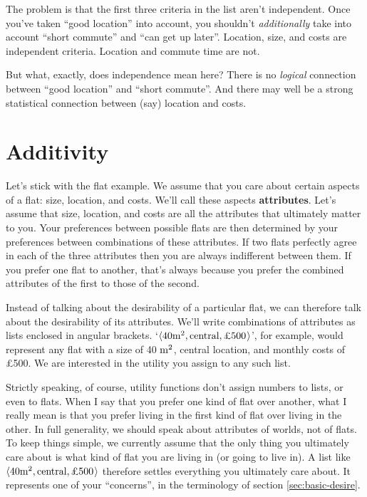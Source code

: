 The problem is that the first three criteria in the list aren't independent.
Once you've taken ``good location'' into account, you shouldn't
\emph{additionally} take into account ``short commute'' and ``can get up
later''. Location, size, and costs are independent criteria. Location and
commute time are not.

But what, exactly, does independence mean here? There is no \emph{logical}
connection between ``good location'' and ``short commute''. And there may well
be a strong statistical connection between (say) location and costs.

\section{Additivity}\label{sec:additivity}

Let's stick with the flat example. We assume that you care about certain aspects
of a flat: size, location, and costs. We'll call these aspects
\textbf{attributes}. Let's assume that size, location, and costs are all the
attributes that ultimately matter to you. Your preferences between possible
flats are then determined by your preferences between combinations of these
attributes. If two flats perfectly agree in each of the three attributes then
you are always indifferent between them. If you prefer one flat to another,
that's always because you prefer the combined attributes of the first to those
of the second.

Instead of talking about the desirability of a particular flat, we can therefore
talk about the desirability of its attributes. We'll write combinations of
attributes as lists enclosed in angular brackets.
`$\t{40 \m^2, \text{central}, \text{£500}}$', for example, would represent any
flat with a size of 40 $\text{m}^2$, central location, and monthly costs of £500. We
are interested in the utility you assign to any such list.



Strictly speaking, of course, utility functions don't assign numbers to lists,
or even to flats. When I say that you prefer one kind of flat over another, what
I really mean is that you prefer living in the first kind of flat over living in
the other. In full generality, we should speak about attributes of worlds, not
of flats. To keep things simple, we currently assume that the only thing you
ultimately care about is what kind of flat you are living in (or going to live
in). A list like $\t{40 \m^2, \text{central}, \text{£500}}$ therefore settles
everything you ultimately care about. It represents one of your ``concerns'', in
the terminology of section \ref{sec:basic-desire}.

